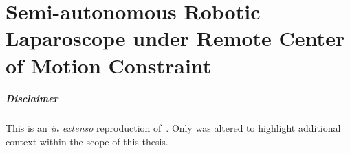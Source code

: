 \graphicspath{{chapter_2}}
\chapter[Semi-autonomous Robotic Laparoscope]{Semi-autonomous Robotic Laparoscope under Remote Center of Motion Constraint}
\label{chap:robotic_endoscope}
\minitoc

\paragraph{Disclaimer} This  is an \textit{in extenso} reproduction of~\cite{huber2021homographybased}. Only  was altered to highlight additional context within the scope of this thesis.






\newpage




